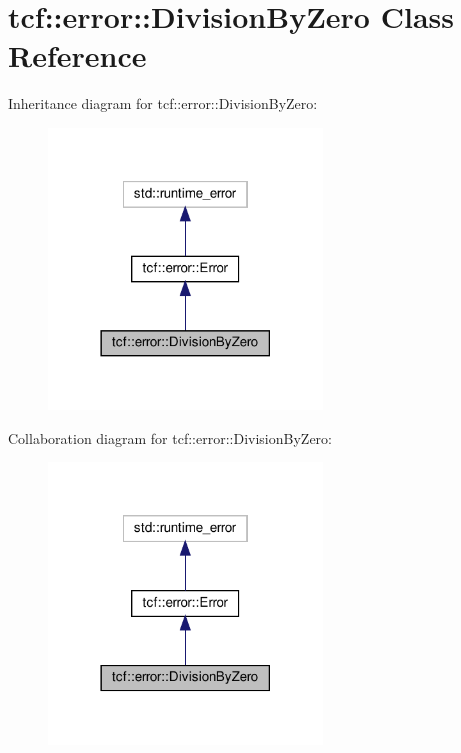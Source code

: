 \hypertarget{classtcf_1_1error_1_1DivisionByZero}{}\section{tcf\+:\+:error\+:\+:Division\+By\+Zero Class Reference}
\label{classtcf_1_1error_1_1DivisionByZero}


Inheritance diagram for tcf\+:\+:error\+:\+:Division\+By\+Zero\+:
\nopagebreak
\begin{figure}[H]
\begin{center}
\leavevmode
\includegraphics[width=206pt]{classtcf_1_1error_1_1DivisionByZero__inherit__graph}
\end{center}
\end{figure}


Collaboration diagram for tcf\+:\+:error\+:\+:Division\+By\+Zero\+:
\nopagebreak
\begin{figure}[H]
\begin{center}
\leavevmode
\includegraphics[width=206pt]{classtcf_1_1error_1_1DivisionByZero__coll__graph}
\end{center}
\end{figure}
